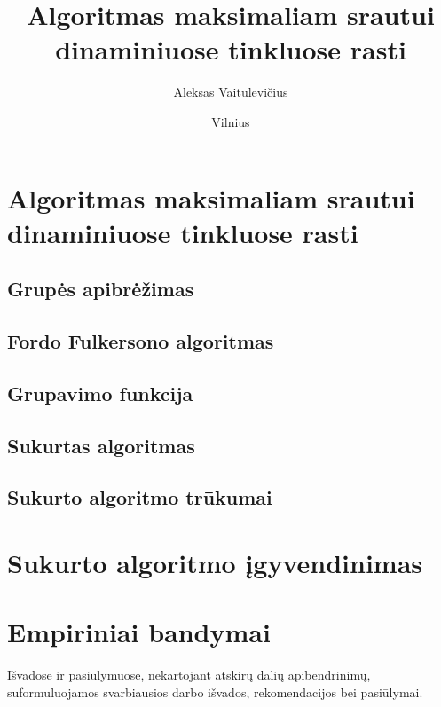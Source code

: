 \documentclass{VUMIFInfBakalaurinis}
\title{Algoritmas maksimaliam srautui dinaminiuose tinkluose rasti}
\author{Aleksas Vaitulevičius}
\date{Vilnius \\ \the\year}
\begin{document}
\maketitle

\tableofcontents





\section{Algoritmas maksimaliam srautui dinaminiuose tinkluose rasti}
\subsection{Grupės apibrėžimas}


\subsection{Fordo Fulkersono algoritmas}


\subsection{Grupavimo funkcija}


\subsection{Sukurtas algoritmas}


\subsection{Sukurto algoritmo trūkumai}


\section{Sukurto algoritmo įgyvendinimas}


\section{Empiriniai bandymai}


Išvadose ir pasiūlymuose, nekartojant atskirų dalių apibendrinimų,
suformuluojamos svarbiausios darbo išvados, rekomendacijos bei pasiūlymai.
\end{document}
